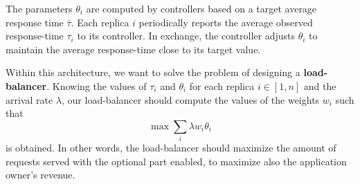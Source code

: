 The parameters $\theta_i$ are computed by controllers based on a
target average response time $\bar{\tau}$. Each replica $i$
periodically reports the average observed response-time $\tau_i$ to
its controller. In exchange, the controller adjusts $\theta_i$ to
maintain the average response-time close to its target value.

Within this architecture, we want to solve the problem of designing a
{\bf load-balancer}. Knowing the values of $\tau_i$ and $\theta_i$ for
each replica $i \in [1, n]$ and the arrival rate $\lambda$, our
load-balancer should compute the values of the weights $w_i$ such that
\begin{equation}
\max \sum_{i} \lambda w_i \theta_i
\end{equation}
is obtained. In other words, the load-balancer should maximize the
amount of requests served with the optional part enabled, to maximize
also the application owner's revenue.
